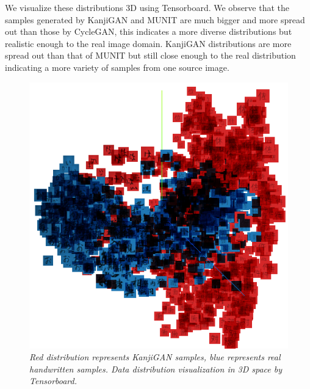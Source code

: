\documentclass[12pt]{report}
\begin{document}
We visualize these distributions 3D using Tensorboard. We observe that the samples generated by KanjiGAN and MUNIT are much bigger and more spread out than those by CycleGAN, this indicates a more diverse distributions but realistic enough to the real image domain. KanjiGAN distributions are more spread out than that of MUNIT but still close enough to the real distribution indicating a more variety of samples from one source image.

\begin{figure}[H]
	\centering
	\includegraphics[scale=1]{real-kanjigan}
	\caption{\textit{Red distribution represents KanjiGAN samples, blue represents real handwritten samples. Data distribution visualization in 3D space by Tensorboard. }}
	\label{fig:data-distribution-2}
\end{figure}
\end{document}
